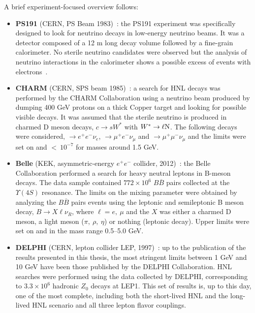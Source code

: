 A brief experiment-focused overview follows:
\begin{itemize}
\item \textbf{PS191} (CERN, PS Beam 1983)~\cite{BERNARDI1988332}: the PS191
  experiment was specifically designed to look for neutrino decays in
  low-energy neutrino beams. It was a detector composed of a 12 m long
  decay volume followed by a fine-grain calorimeter. No sterile
  neutrino candidates were observed but the analysis of neutrino
  interactions in the calorimeter shows a possible excess of events
  with electrons~\cite{Vannucci:1985vs}.
\item \textbf{CHARM} (CERN, SPS beam 1985)~\cite{DORENBOSCH1986473}: a search
  for HNL decays  was performed by the CHARM Collaboration using a
  neutrino beam produced by dumping 400 GeV protons on a thick Copper
  target and looking for possible visible decays. It was assumed that
  the sterile neutrino is produced in charmed D meson decays, \ie $c\rightarrow s W^{*}$ with $W^{*} \rightarrow \ell \mathrm{N}$. The following decays were considered, \hnl $\rightarrow
  e^+e^-\nu_e$, $\rightarrow \mu^+e^-\nu_\mu$ and $\rightarrow
  \mu^+\mu^-\nu_\mu$ and the limits were set on \mixpare and
  \mixparm $< \:10^{-7}$ for \hnl masses around 1.5 GeV. 
\item \textbf{Belle} (KEK, asymmetric-energy $e^+e^-$ collider, 2012)~\cite{Liventsev_2013}: the Belle Collaboration
  performed a search for heavy neutral leptons in B-meson
  decays. The data sample contained $772\times 10^6$ $B\overline{B}$
  pairs collected at the $\Upsilon(4S)$ resonance. The limits
  on the mixing parameter were obtained by analyzing the $B\overline{B}$ pairs
  events using the leptonic and semileptonic B meson decay,
  $B\rightarrow X\ell\nu_R$, where $\ell = e, \: \mu$ and the $X$ was
  either a charmed D meson, a light meson ($\pi, \: \rho, \: \eta$) or
  nothing (leptonic decay). Upper limits were set on \mixpare and
  \mixparm in the mass range 0.5--5.0 GeV. 
\item \textbf{DELPHI} (CERN, lepton collider LEP, 1997)~\cite{Abreu:1996pa}:
  up to the publication of the results presented in this thesis, the most stringent limits between 1 GeV and 10 GeV have been those published by the DELPHI Collaboration. HNL searches were performed
  using the data collected by DELPHI, corresponding to $3.3
  \times 10^6$ hadronic $Z_0$ decays at LEP1. This set of results is, up to
  this day, one of the most complete, including both the short-lived HNL and the long-lived
  HNL scenario and all three lepton flavor couplings. 

\end{itemize}
